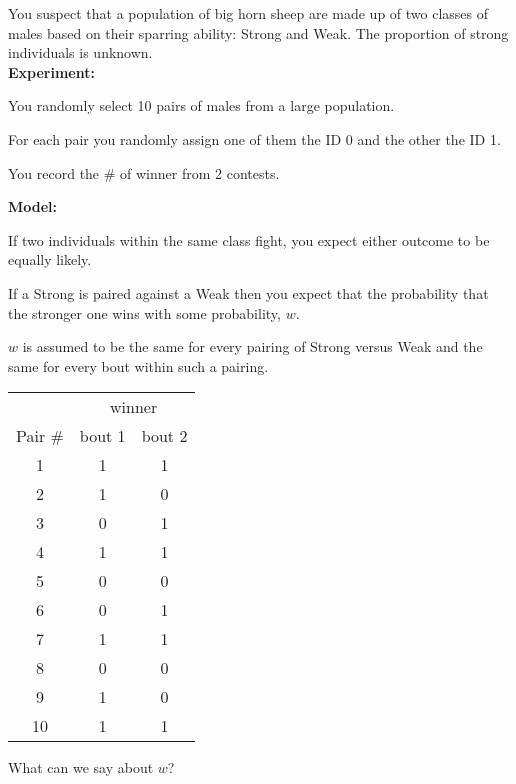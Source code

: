 \documentclass[landscape]{foils}
\newcommand{\myBackground}{\begin{picture}(0,0)(0,0)  \put(-40,-70){\makebox(0,0)[l]{\texttt{[image: images/baby\_blue.jpg]}}} \end{picture}}
\newcommand{\myFooter}{}
\newcommand{\myNewSlide}{\newpage\myFooter} %
\begin{document}
\pagecolor{white}
\unitlength=1mm

\myNewSlide
You suspect that a population of big horn sheep are made up of two classes of males based on their sparring ability: Strong and Weak. The proportion of strong individuals is unknown.\\ {\bf Experiment:}
\begin{compactitem}
	\item You randomly select 10 pairs of males from a large population. 
	\item For each pair you randomly assign one of them the ID 0 and the other the ID 1.  
	\item You record the \# of winner from 2 contests.
\end{compactitem}
{\bf Model:}
\begin{compactitem}
	\item If two individuals within the same class fight, you expect either outcome to be equally likely.
	\item If a Strong is paired against a Weak then you expect that the probability that the stronger one wins with some probability, $w$.
	\item $w$ is assumed to be the same for every pairing of Strong {versus} Weak and the same for every bout within such a pairing.
\end{compactitem}

\myNewSlide
\begin{center}
\begin{tabular}{|c|c|c|}
\hline
& \multicolumn{2}{c|}{winner}\\
Pair \# & bout 1 & bout 2 \\
\hline
1 & 1 & 1  \\
\hline
2 & 1 & 0  \\
\hline
3 & 0 & 1  \\
\hline
4 & 1 & 1  \\
\hline
5 & 0 & 0  \\
\hline
6 & 0 & 1   \\
\hline
7 & 1 & 1  \\
\hline
8 & 0 & 0  \\
\hline
9 & 1 & 0  \\
\hline
10 & 1 & 1   \\
\hline
\end{tabular}
\end{center}

What can we say about $w$?
\end{document}

